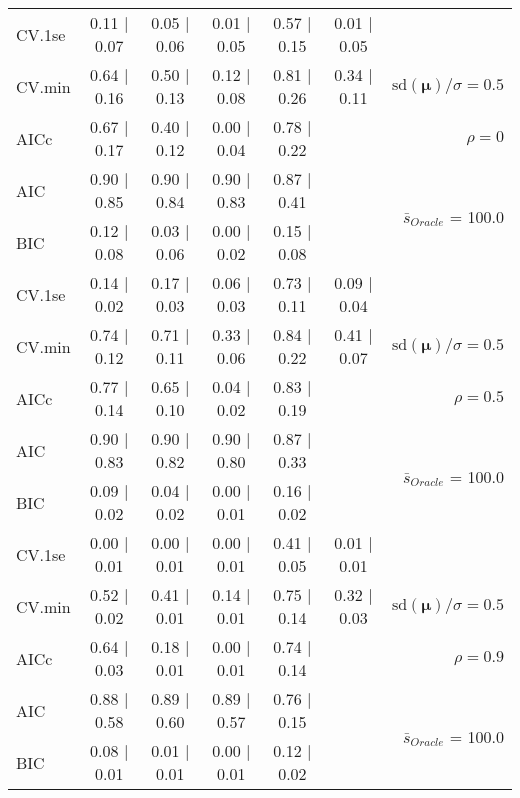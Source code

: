 \begin{table}
\begin{center}
\begin{tabular}{l*{5}{c}|r}
 \hline 
CV.1se & 0.11 $\mid$ 0.07 & 0.05 $\mid$ 0.06 & 0.01 $\mid$ 0.05 & 0.57 $\mid$ 0.15 & 0.01 $\mid$ 0.05 & \\
CV.min & 0.64 $\mid$ 0.16 & 0.50 $\mid$ 0.13 & 0.12 $\mid$ 0.08 & 0.81 $\mid$ 0.26 & 0.34 $\mid$ 0.11 &  $\mathrm{sd}(\mathbf{\mu})/\sigma=0.5$ \\
AICc & 0.67 $\mid$ 0.17 & 0.40 $\mid$ 0.12 & 0.00 $\mid$ 0.04 & 0.78 $\mid$ 0.22 & & $\rho=0$ \\
AIC & 0.90 $\mid$ 0.85 & 0.90 $\mid$ 0.84 & 0.90 $\mid$ 0.83 & 0.87 $\mid$ 0.41 & &  \multirow{2}{*}{$\bar{s}_{Oracle}$ = 100.0} \\
BIC & 0.12 $\mid$ 0.08 & 0.03 $\mid$ 0.06 & 0.00 $\mid$ 0.02 & 0.15 $\mid$ 0.08 & &  \\
 \hline 
CV.1se & 0.14 $\mid$ 0.02 & 0.17 $\mid$ 0.03 & 0.06 $\mid$ 0.03 & 0.73 $\mid$ 0.11 & 0.09 $\mid$ 0.04 & \\
CV.min & 0.74 $\mid$ 0.12 & 0.71 $\mid$ 0.11 & 0.33 $\mid$ 0.06 & 0.84 $\mid$ 0.22 & 0.41 $\mid$ 0.07 &  $\mathrm{sd}(\mathbf{\mu})/\sigma=0.5$ \\
AICc & 0.77 $\mid$ 0.14 & 0.65 $\mid$ 0.10 & 0.04 $\mid$ 0.02 & 0.83 $\mid$ 0.19 & & $\rho=0.5$ \\
AIC & 0.90 $\mid$ 0.83 & 0.90 $\mid$ 0.82 & 0.90 $\mid$ 0.80 & 0.87 $\mid$ 0.33 & &  \multirow{2}{*}{$\bar{s}_{Oracle}$ = 100.0} \\
BIC & 0.09 $\mid$ 0.02 & 0.04 $\mid$ 0.02 & 0.00 $\mid$ 0.01 & 0.16 $\mid$ 0.02 & &  \\
 \hline 
CV.1se & 0.00 $\mid$ 0.01 & 0.00 $\mid$ 0.01 & 0.00 $\mid$ 0.01 & 0.41 $\mid$ 0.05 & 0.01 $\mid$ 0.01 & \\
CV.min & 0.52 $\mid$ 0.02 & 0.41 $\mid$ 0.01 & 0.14 $\mid$ 0.01 & 0.75 $\mid$ 0.14 & 0.32 $\mid$ 0.03 &  $\mathrm{sd}(\mathbf{\mu})/\sigma=0.5$ \\
AICc & 0.64 $\mid$ 0.03 & 0.18 $\mid$ 0.01 & 0.00 $\mid$ 0.01 & 0.74 $\mid$ 0.14 & & $\rho=0.9$ \\
AIC & 0.88 $\mid$ 0.58 & 0.89 $\mid$ 0.60 & 0.89 $\mid$ 0.57 & 0.76 $\mid$ 0.15 & &  \multirow{2}{*}{$\bar{s}_{Oracle}$ = 100.0} \\
BIC & 0.08 $\mid$ 0.01 & 0.01 $\mid$ 0.01 & 0.00 $\mid$ 0.01 & 0.12 $\mid$ 0.02 & &  \\
 \hline 
\end{tabular}
\end{center}
\vspace{-1cm}
\end{table}




